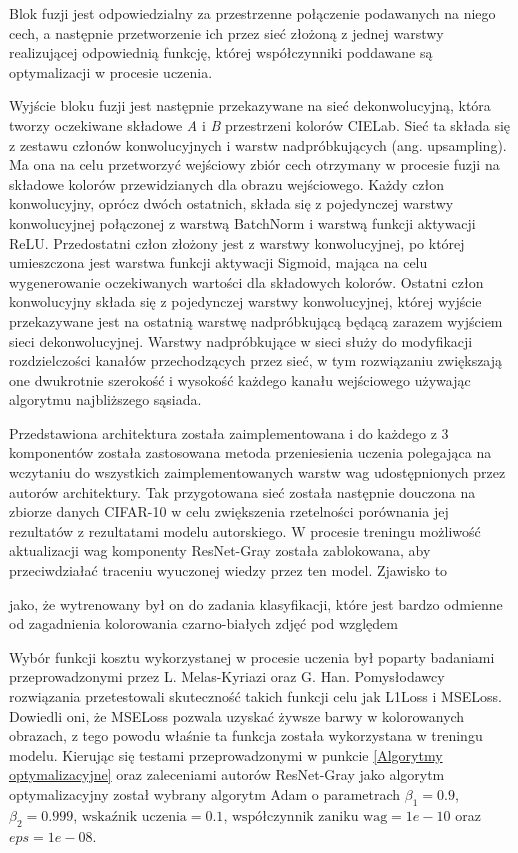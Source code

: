   Blok fuzji jest odpowiedzialny za przestrzenne połączenie podawanych
  na niego cech, a następnie przetworzenie ich przez sieć złożoną z jednej
  warstwy realizującej odpowiednią funkcję, której współczynniki poddawane są
  optymalizacji w procesie uczenia.

  Wyjście bloku fuzji jest następnie przekazywane na sieć dekonwolucyjną, która
  tworzy oczekiwane składowe \textit{A} i \textit{B} przestrzeni kolorów CIELab.
  Sieć ta składa się z zestawu członów konwolucyjnych i warstw nadpróbkujących
  (ang. upsampling). Ma ona na celu przetworzyć wejściowy zbiór cech otrzymany w
  procesie fuzji na składowe kolorów przewidzianych dla obrazu wejściowego.
  Każdy człon konwolucyjny, oprócz dwóch ostatnich, składa się z pojedynczej
  warstwy konwolucyjnej połączonej z warstwą BatchNorm i warstwą funkcji
  aktywacji ReLU. Przedostatni człon złożony jest z warstwy konwolucyjnej, po
  której umieszczona jest warstwa funkcji aktywacji Sigmoid, mająca na celu
  wygenerowanie oczekiwanych wartości dla składowych kolorów. Ostatni człon
  konwolucyjny składa się z pojedynczej warstwy konwolucyjnej, której wyjście
  przekazywane jest na ostatnią warstwę nadpróbkującą będącą zarazem wyjściem
  sieci dekonwolucyjnej.
  Warstwy nadpróbkujące w sieci służy do modyfikacji rozdzielczości kanałów
  przechodzących przez sieć, w tym rozwiązaniu zwiększają one
  dwukrotnie szerokość i wysokość każdego kanału wejściowego używając algorytmu
  najbliższego sąsiada.

  Przedstawiona architektura została zaimplementowana i do każdego z 3
  komponentów została zastosowana metoda przeniesienia uczenia polegająca na
  wczytaniu do wszystkich zaimplementowanych warstw wag udostępnionych przez
  autorów architektury. Tak przygotowana sieć została następnie douczona
  na zbiorze danych CIFAR-10 w celu zwiększenia rzetelności porównania jej
  rezultatów z rezultatami modelu autorskiego. W procesie treningu
  możliwość aktualizacji wag komponenty ResNet-Gray została zablokowana, aby
  przeciwdziałać traceniu wyuczonej wiedzy przez ten model. Zjawisko to

  jako, że
  wytrenowany był on do zadania klasyfikacji, które jest bardzo odmienne
  od zagadnienia kolorowania czarno-białych zdjęć pod względem

  Wybór funkcji kosztu wykorzystanej w procesie uczenia był poparty badaniami
  przeprowadzonymi przez L. Melas-Kyriazi oraz G. Han. Pomysłodawcy rozwiązania przetestowali skuteczność takich funkcji celu jak L1Loss i MSELoss. Dowiedli
  oni, że MSELoss pozwala uzyskać żywsze barwy w kolorowanych obrazach, z tego
  powodu właśnie ta funkcja została wykorzystana w treningu modelu.
  Kierując się testami przeprowadzonymi w punkcie \ref{Algorytmy optymalizacyjne}
  oraz zaleceniami autorów ResNet-Gray jako algorytm optymalizacyjny został
  wybrany algorytm Adam o parametrach $\beta_{1} = 0.9$, $\beta_{2} = 0.999$,
  $\text{wskaźnik uczenia} = 0.1$, $\text{współczynnik zaniku wag} = 1e-10$ oraz
  $eps=1e-08$.

